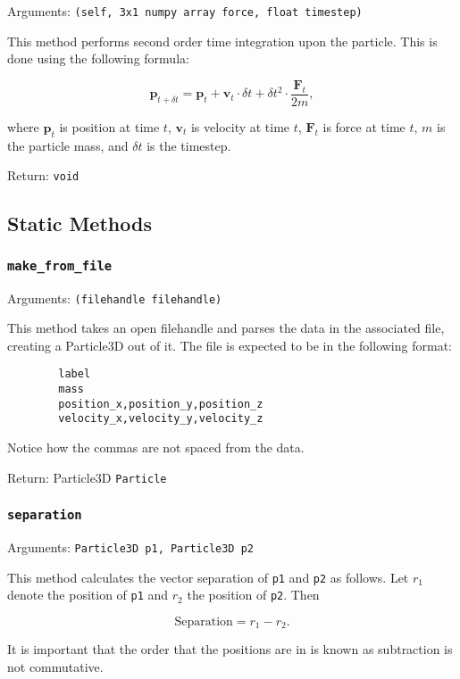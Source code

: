 \documentclass[a4paper, 11pt, british, left=1in, right=1in, top=0.3in, bottom=1in]{article}
\begin{document}
	Arguments: \texttt{(self, 3x1 numpy array force, float timestep)}
	
	This method performs second order time integration upon the particle. This is done using the following formula: 
	
	$$\textbf{p}_{t+\delta t} = \textbf{p}_t + \textbf{v}_t\cdot\delta t + \delta t^2 \cdot \frac{\textbf{F}_t}{2m},$$
	
	where $\textbf{p}_t$ is position at time $t$, $\textbf{v}_t$ is velocity at time $t$, $\textbf{F}_t$ is force at time $t$, $m$ is the particle mass, and $\delta t$ is the timestep. 
	
	Return: \texttt{void}
	
	\subsection{Static Methods}
	
	\subsubsection{\texttt{make\_from\_file}}
	
	Arguments: \texttt{(filehandle filehandle)}
	
	This method takes an open filehandle and parses the data in the associated file, creating a Particle3D out of it. The file is expected to be in the following format:
	
	\begin{verbatim}
		label
		mass
		position_x,position_y,position_z
		velocity_x,velocity_y,velocity_z
	\end{verbatim}
	
	Notice how the commas are not spaced from the data.
	
	Return: Particle3D \texttt{Particle}
	
	\subsubsection{\texttt{separation}}
	
	Arguments: \texttt{Particle3D p1, Particle3D p2}
	
	This method calculates the vector separation of \texttt{p1} and \texttt{p2} as follows. Let $r_1$ denote the position of \texttt{p1} and $r_2$ the position of \texttt{p2}. Then
	
	$$\text{Separation} = r_1 - r_2.$$
	
	It is important that the order that the positions are in is known as subtraction is not commutative. 
	
\end{document}
